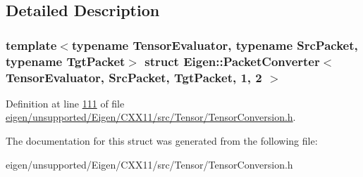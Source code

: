 \subsection{Detailed Description}
\subsubsection*{template$<$typename Tensor\+Evaluator, typename Src\+Packet, typename Tgt\+Packet$>$\newline
struct Eigen\+::\+Packet\+Converter$<$ Tensor\+Evaluator, Src\+Packet, Tgt\+Packet, 1, 2 $>$}



Definition at line \hyperlink{eigen_2unsupported_2_eigen_2_c_x_x11_2src_2_tensor_2_tensor_conversion_8h_source_l00111}{111} of file \hyperlink{eigen_2unsupported_2_eigen_2_c_x_x11_2src_2_tensor_2_tensor_conversion_8h_source}{eigen/unsupported/\+Eigen/\+C\+X\+X11/src/\+Tensor/\+Tensor\+Conversion.\+h}.



The documentation for this struct was generated from the following file\+:\begin{DoxyCompactItemize}
\item 
eigen/unsupported/\+Eigen/\+C\+X\+X11/src/\+Tensor/\+Tensor\+Conversion.\+h\end{DoxyCompactItemize}
